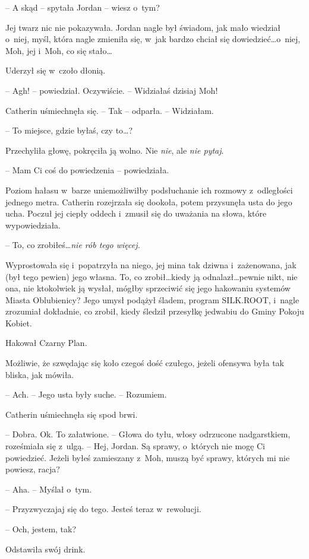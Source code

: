 \documentclass[oneside,polish,11pt,sfheadings]{mwbk}
\begin{document}
-- A skąd -- spytała Jordan -- wiesz o~tym?

Jej twarz nic nie pokazywała. Jordan nagle był świadom, jak mało
wiedział o~niej, myśl, która nagle zmieniła się, w~jak bardzo chciał się
dowiedzieć\ldots o~niej, Moh, jej i~Moh, co się stało\ldots

Uderzył się w~czoło dłonią.

-- Agh! -- powiedział. Oczywiście. -- Widziałaś dzisiaj Moh!

Catherin uśmiechnęła się. -- Tak -- odparła. -- Widziałam.

-- To miejsce, gdzie byłaś, czy to\ldots?

Przechyliła głowę, pokręciła ją wolno. Nie \emph{nie}, ale \emph{nie
pytaj}.

-- Mam Ci coś do powiedzenia -- powiedziała.

Poziom hałasu w~barze uniemożliwiłby podsłuchanie ich rozmowy z~odległości jednego metra. Catherin rozejrzała się dookoła, potem
przysunęła usta do jego ucha. Poczuł jej ciepły oddech i~zmusił się do
uważania na słowa, które wypowiedziała.

-- To, co zrobiłeś\ldots \emph{nie rób tego więcej.}

Wyprostowała się i~popatrzyła na niego, jej mina tak dziwna i~zażenowana, jak (był tego pewien) jego własna. To, co zrobił\ldots kiedy ją
odnalazł\ldots pewnie nikt, nie ona, nie ktokolwiek ją wysłał, mógłby
sprzeciwić się jego hakowaniu systemów Miasta Oblubienicy? Jego umysł
podążył śladem, program SILK.ROOT, i~nagle zrozumiał dokładnie, co
zrobił, kiedy śledził przesyłkę jedwabiu do Gminy Pokoju Kobiet.

Hakował Czarny Plan.

Możliwie, że szwędając się koło czegoś dość czułego, jeżeli ofensywa
była tak bliska, jak mówiła.

-- Ach. -- Jego usta były suche. -- Rozumiem.

Catherin uśmiechnęła się spod brwi. 

-- Dobra. Ok. To załatwione. -- Głowa
do tyłu, włosy odrzucone nadgarstkiem, roześmiała się z~ulgą. -- Hej,
Jordan. Są sprawy, o~których nie mogę Ci powiedzieć. Jeżeli byłeś
zamieszany z~Moh, muszą być sprawy, których mi nie powiesz, racja?

-- Aha. -- Myślał o~tym.

-- Przyzwyczajaj się do tego. Jesteś teraz w~rewolucji.

-- Och, jestem, tak?

Odstawiła swój drink. 
\end{document}
